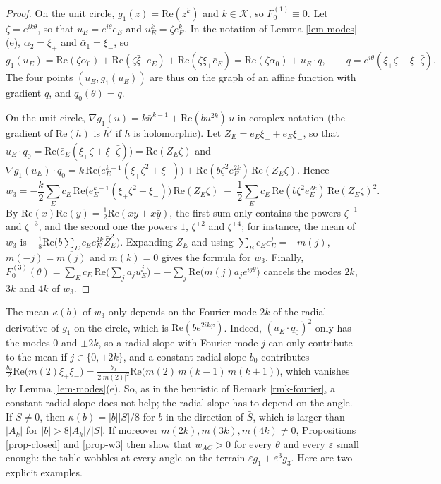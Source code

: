 \documentclass[a4paper,11pt,twoside,leqno]{article}
\newcommand{\eps}[0]{\varepsilon}
\numberwithin{equation}{section}
\begin{document}
\begin{proof}
On the unit circle, $g_1(z) = \mathrm{Re}(z^k)$ and $k \in \mathcal{K}$, so $F_0^{(1)} \equiv 0$. Let $\zeta = e^{ik\theta}$, so that $u_E = e^{i\theta} e_E$ and $u_E^k = \zeta e_E^k$. In the notation of Lemma \ref{lem-modes}(e), $\alpha_2 = \xi_+$ and $\bar\alpha_1 = \xi_-$, so
\[
g_1(u_E) = \mathrm{Re}(\zeta \alpha_0) + \mathrm{Re}(\zeta \bar\xi_- e_E) + \mathrm{Re}(\zeta \xi_+ \bar e_E) = \mathrm{Re}(\zeta\alpha_0) + u_E \cdot q,
\qquad
q = e^{i\theta}(\xi_+ \zeta + \xi_- \bar \zeta).
\]
The four points $(u_E, g_1(u_E))$ are thus on the graph of an affine function with gradient $q$, and $q_0(\theta) = q$.

On the unit circle, $\nabla g_1(u) = k \bar u^{k-1} + \mathrm{Re}(b u^{2k})\, u$ in complex notation (the gradient of $\mathrm{Re}(h)$ is $\overline{h'}$ if $h$ is holomorphic). Let $Z_E = \bar e_E \xi_+ + e_E \bar\xi_-$, so that $u_E \cdot q_0 = \mathrm{Re}\big(\bar e_E (\xi_+\zeta + \xi_-\bar\zeta)\big) = \mathrm{Re}(Z_E \zeta)$ and $\nabla g_1(u_E) \cdot q_0 = k\, \mathrm{Re}\big(e_E^{k-1}(\xi_+\zeta^2 + \xi_-)\big) + \mathrm{Re}(b \zeta^2 e_E^{2k})\, \mathrm{Re}(Z_E\zeta)$. Hence
\[
w_3 = -\frac{k}{2} \sum_E c_E\, \mathrm{Re}\big(e_E^{k-1}(\xi_+\zeta^2 + \xi_-)\big)\, \mathrm{Re}(Z_E \zeta) \; - \; \frac{1}{2} \sum_E c_E\, \mathrm{Re}(b\zeta^2 e_E^{2k})\, \mathrm{Re}(Z_E\zeta)^2.
\]
By $\mathrm{Re}(x)\mathrm{Re}(y) = \frac{1}{2}\mathrm{Re}(xy + x\bar y)$, the first sum only contains the powers $\zeta^{\pm 1}$ and $\zeta^{\pm 3}$, and the second one the powers $1$, $\zeta^{\pm 2}$ and $\zeta^{\pm 4}$; for instance, the mean of $w_3$ is $-\frac{1}{8}\mathrm{Re}\big(b \sum_E c_E e_E^{2k} \bar Z_E^2\big)$. Expanding $Z_E$ and using $\sum_E c_E e_E^j = -m(j)$, $m(-j) = \overline{m(j)}$ and $m(k) = 0$ gives the formula for $w_3$. Finally, $F_0^{(3)}(\theta) = \sum_E c_E\, \mathrm{Re}\big(\sum_j a_j u_E^j\big) = -\sum_j \mathrm{Re}\big(m(j) a_j e^{ij\theta}\big)$ cancels the modes $2k$, $3k$ and $4k$ of $w_3$.
\end{proof}

The mean $\kappa(b)$ of $w_3$ only depends on the Fourier mode $2k$ of the radial derivative of $g_1$ on the circle, which is $\mathrm{Re}(b e^{2ik\varphi})$. Indeed, $(u_E \cdot q_0)^2$ only has the modes $0$ and $\pm 2k$, so a radial slope with Fourier mode $j$ can only contribute to the mean if $j \in \{0, \pm 2k\}$, and a constant radial slope $b_0$ contributes $\frac{b_0}{2}\mathrm{Re}\big(\overline{m(2)} \xi_+ \xi_-\big) = \frac{b_0}{2|m(2)|^2}\mathrm{Re}\big(m(2)\, m(k-1)\, \overline{m(k+1)}\big)$, which vanishes by Lemma \ref{lem-modes}(e). So, as in the heuristic of Remark \ref{rmk-fourier}, a constant radial slope does not help; the radial slope has to depend on the angle. If $S \neq 0$, then $\kappa(b) = |b||S|/8$ for $b$ in the direction of $\bar S$, which is larger than $|A_k|$ for $|b| > 8|A_k|/|S|$. If moreover $m(2k), m(3k), m(4k) \neq 0$, Propositions \ref{prop-closed} and \ref{prop-w3} then show that $w_{AC} > 0$ for every $\theta$ and every $\eps$ small enough: the table wobbles at every angle on the terrain $\eps g_1 + \eps^3 g_3$. Here are two explicit examples.
\end{document}
